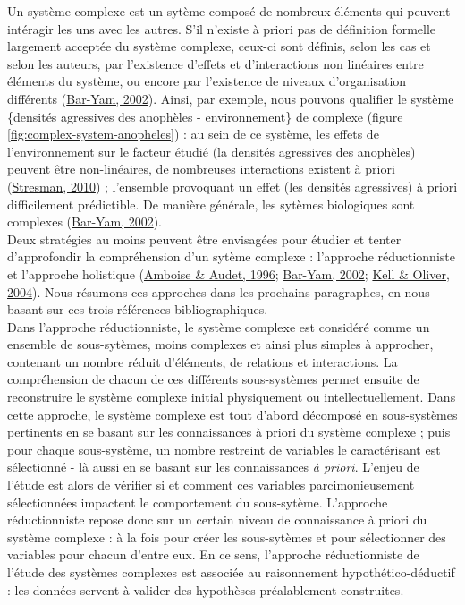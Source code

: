 \documentclass[12pt,twoside]{reedthesis}
\begin{document}
Un système complexe est un sytème composé de nombreux éléments qui peuvent intéragir les uns avec les autres. S'il n'existe à priori pas de définition formelle largement acceptée du système complexe, ceux-ci sont définis, selon les cas et selon les auteurs, par l'existence d'effets et d'interactions non linéaires entre éléments du système, ou encore par l'existence de niveaux d'organisation différents (\protect\hyperlink{ref-bar-yam_general_nodate}{Bar-Yam, 2002}). Ainsi, par exemple, nous pouvons qualifier le système \{densités agressives des anophèles - environnement\} de complexe (figure \ref{fig:complex-system-anopheles}) : au sein de ce système, les effets de l'environnement sur le facteur étudié (la densités agressives des anophèles) peuvent être non-linéaires, de nombreuses interactions existent à priori (\protect\hyperlink{ref-stresman_beyond_2010}{Stresman, 2010}) ; l'ensemble provoquant un effet (les densités agressives) à priori difficilement prédictible. De manière générale, les sytèmes biologiques sont complexes (\protect\hyperlink{ref-bar-yam_general_nodate}{Bar-Yam, 2002}).\\

Deux stratégies au moins peuvent être envisagées pour étudier et tenter d'approfondir la compréhension d'un sytème complexe : l'approche réductionniste et l'approche holistique (\protect\hyperlink{ref-amboise_projet_1996}{Amboise \& Audet, 1996}; \protect\hyperlink{ref-bar-yam_general_nodate}{Bar-Yam, 2002}; \protect\hyperlink{ref-kell_here_2004}{Kell \& Oliver, 2004}). Nous résumons ces approches dans les prochains paragraphes, en nous basant sur ces trois références bibliographiques.\\

Dans l'approche réductionniste, le système complexe est considéré comme un ensemble de sous-sytèmes, moins complexes et ainsi plus simples à approcher, contenant un nombre réduit d'éléments, de relations et interactions. La compréhension de chacun de ces différents sous-systèmes permet ensuite de reconstruire le système complexe initial physiquement ou intellectuellement. Dans cette approche, le système complexe est tout d'abord décomposé en sous-systèmes pertinents en se basant sur les connaissances à priori du système complexe ; puis pour chaque sous-système, un nombre restreint de variables le caractérisant est sélectionné - là aussi en se basant sur les connaissances \emph{à priori}. L'enjeu de l'étude est alors de vérifier si et comment ces variables parcimonieusement sélectionnées impactent le comportement du sous-sytème. L'approche réductionniste repose donc sur un certain niveau de connaissance à priori du système complexe : à la fois pour créer les sous-sytèmes et pour sélectionner des variables pour chacun d'entre eux. En ce sens, l'approche réductionniste de l'étude des systèmes complexes est associée au raisonnement hypothético-déductif : les données servent à valider des hypothèses préalablement construites.\\
\end{document}
